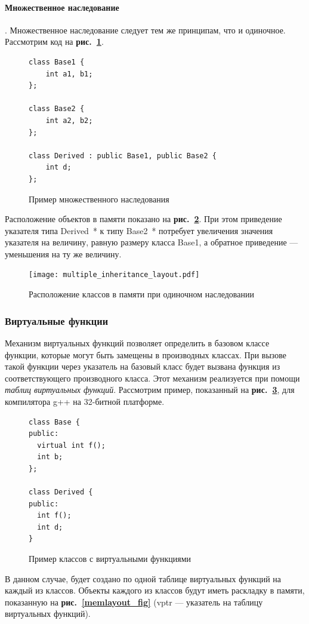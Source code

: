 \documentclass[a4paper,12pt,russian]{article}
\newcommand{\picref}[1]{\textbf{рис.~\ref{#1}}}
\newcommand{\code}[1]{\textsf{#1}}
\begin{document}
\paragraph{Множественное наследование}.
Множественное наследование следует тем же принципам, что и одиночное. Рассмотрим код на \picref{multiple_inheritance_lst}.
\begin{figure}
\begin{lstlisting}
class Base1 {
    int a1, b1;
};

class Base2 {
    int a2, b2;
};

class Derived : public Base1, public Base2 {
    int d;
};
\end{lstlisting}
\caption{Пример множественного наследования}
\label{multiple_inheritance_lst}
\end{figure}
Расположение объектов в памяти показано на \picref{multiple_inheritance_layout_fig}.
При этом приведение указателя типа \code{Derived~*} к типу \code{Base2~*} потребует увеличения значения указателя на величину, равную размеру класса \code{Base1}, а обратное приведение --- уменьшения на ту же величину.
\begin{figure}
  \center
  \texttt{[image: multiple\_inheritance\_layout.pdf]}
  \hfill
  \caption{Расположение классов в памяти при одиночном наследовании}
  \label{multiple_inheritance_layout_fig}
\end{figure}

\subsubsection{Виртуальные функции}
\label{virtual_call}
Механизм виртуальных функций позволяет определить в базовом классе функции, которые могут быть замещены в производных классах.
При вызове такой функции через указатель на базовый класс будет вызвана функция из соответствующего производного класса.
Этот механизм реализуется при помощи \emph{таблиц виртуальных функций}.
Рассмотрим пример, показанный на \picref{virtual_functions_lst}, для компилятора g++ на 32-битной платформе.
\begin{figure}
\begin{lstlisting}
class Base {
public:
  virtual int f();
  int b;
};

class Derived {
public:
  int f();
  int d;
}
\end{lstlisting}
\caption{Пример классов с виртуальными функциями}
\label{virtual_functions_lst}
\end{figure}

В данном случае, будет создано по одной таблице виртуальных функций на каждый из классов.
Объекты каждого из классов будут иметь раскладку в памяти, показанную на \picref{memlayout_fig} (\code{vptr} --- указатель на таблицу виртуальных функций).
\end{document}
